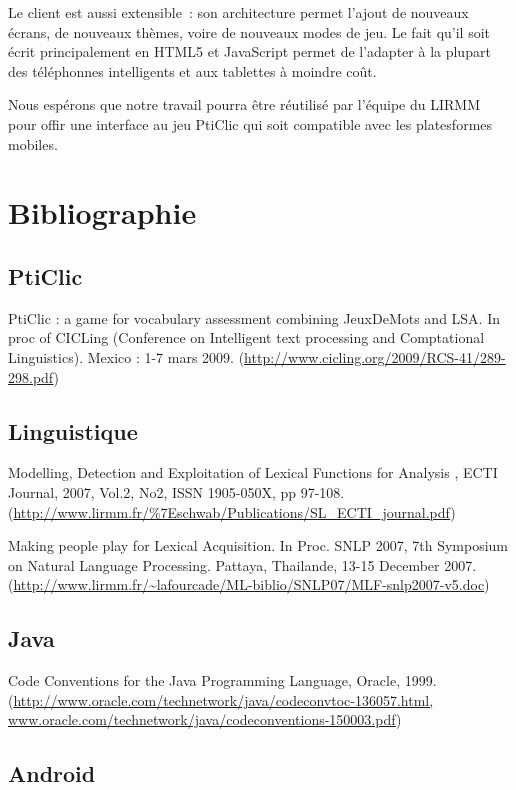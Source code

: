 \documentclass[a4paper,11pt,french]{article}
\def\android{Android\texttrademark{}}
\begin{document}
Le client est aussi extensible~: son architecture permet l'ajout de nouveaux écrans, de nouveaux thèmes, voire de nouveaux modes de jeu. Le
fait qu'il soit écrit principalement en HTML5 et JavaScript permet de l'adapter à la plupart des téléphonnes intelligents et aux tablettes à
moindre coût.

Nous espérons que notre travail pourra être réutilisé par l'équipe du LIRMM pour offir une interface au jeu PtiClic qui soit compatible avec
les platesformes mobiles.

\newpage


\section{Bibliographie}
\subsection{PtiClic}

PtiClic : a game for vocabulary assessment combining JeuxDeMots and LSA. In proc of CICLing (Conference on Intelligent text processing and Comptational Linguistics). Mexico : 1-7 mars 2009. (\url{http://www.cicling.org/2009/RCS-41/289-298.pdf})


\subsection{Linguistique}

Modelling, Detection and Exploitation of Lexical Functions for Analysis , ECTI Journal, 2007, Vol.2, No2, ISSN 1905-050X, pp 97-108. (\url{http://www.lirmm.fr/\%7Eschwab/Publications/SL_ECTI_journal.pdf})

Making people play for Lexical Acquisition. In Proc. SNLP 2007, 7th Symposium on Natural Language Processing. Pattaya, Thailande, 13-15 December 2007. (\url{http://www.lirmm.fr/~lafourcade/ML-biblio/SNLP07/MLF-snlp2007-v5.doc})


\subsection{Java}

Code Conventions for the Java Programming Language, Oracle, 1999. (\url{http://www.oracle.com/technetwork/java/codeconvtoc-136057.html, www.oracle.com/technetwork/java/codeconventions-150003.pdf})

\subsection{\android{}}
\end{document}
